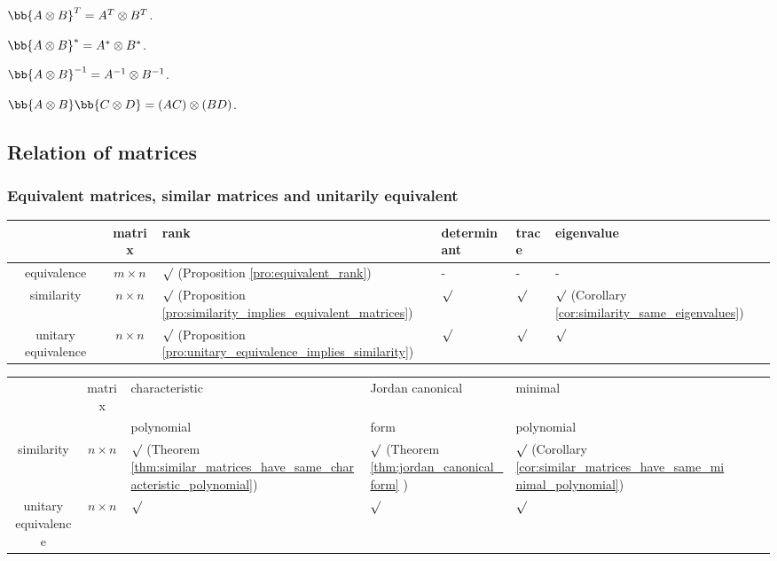\ben
\item [(i)] $\bb{A\otimes B}^T =  A^T\otimes B^T$.
\item [(Ii)] $\bb{A\otimes B}^* =  A^*\otimes B^*$.
\item [(iii)] $\bb{A\otimes B}^{-1} =  A^{-1}\otimes B^{-1}$.
\item [(iv)] $\bb{A\otimes B}\bb{C\otimes D} = (AC) \otimes (BD)$.
\een

\subsection{Relation of matrices}

\subsubsection{Equivalent matrices, similar matrices and unitarily equivalent}

\begin{center}
\begin{tabular}{ccllll}
\hline
 & matrix  & rank & determinant & trace & eigenvalue \\\hline
equivalence & $m \times n$ & $\surd$ (Proposition \ref{pro:equivalent_rank}) & - & - & -  \\
similarity & $n\times n$ & $\surd$ (Proposition \ref{pro:similarity_implies_equivalent_matrices}) & $\surd$ & $\surd$  & $\surd$ (Corollary \ref{cor:similarity_same_eigenvalues})  \\
unitary equivalence & $n\times n$ & $\surd$ (Proposition \ref{pro:unitary_equivalence_implies_similarity}) & $\surd$ & $\surd$ & $\surd$  \\
\hline
\end{tabular}
\end{center}


\begin{center}
\begin{tabular}{ccllllll}
\hline
 & matrix  & characteristic  & Jordan canonical & minimal & & &  \\
 &  & polynomial & form & polynomial & & &  \\
 \hline
similarity & $n\times n$ & $\surd$ (Theorem \ref{thm:similar_matrices_have_same_characteristic_polynomial}) & $\surd$ (Theorem \ref{thm:jordan_canonical_form} ) & $\surd$ (Corollary \ref{cor:similar_matrices_have_same_minimal_polynomial}) & & & \\
unitary equivalence & $n\times n$ & $\surd$ & $\surd$ & $\surd$ & & & \\
\hline
\end{tabular}
\end{center}

